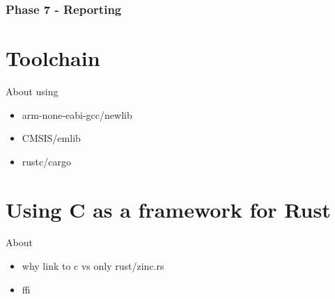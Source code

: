 \subsubsection{Phase 7 - Reporting}

\section{Toolchain}

About using
\begin{itemize}
 \item arm-none-eabi-gcc/newlib
 \item CMSIS/emlib
 \item rustc/cargo
\end{itemize}

\section{Using C as a framework for Rust}

About
\begin{itemize}
 \item why link to c vs only rust/zinc.rs
 \item ffi
\end{itemize}
